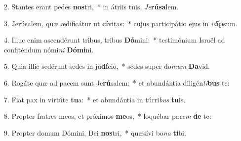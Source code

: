 2. Stantes erant pedes \textbf{nos}tri,~*  in átriis tuis, \textit{Je}\textbf{rú}\textbf{sa}lem.\

3. Jerúsalem, quæ ædificátur ut \textbf{cí}vitas:~*  cujus participátio ejus in \textit{id}\textbf{íp}sum.\

4. Illuc enim ascendérunt tribus, tribus \textbf{Dó}mini:~*  testimónium Israël ad confiténdum nómi\textit{ni} \textbf{Dó}\textbf{mi}ni.\

5. Quia illic sedérunt sedes in ju\textbf{dí}cio,~*  sedes super do\textit{mum} \textbf{Da}vid.\

6. Rogáte quæ ad pacem sunt Je\textbf{rú}salem:~*  et abundántia diligén\textit{ti}\textbf{bus} te:\

7. Fiat pax in virtúte \textbf{tu}a:~*  et abundántia in túrri\textit{bus} \textbf{tu}is.\

8. Propter fratres meos, et próximos \textbf{me}os,~*  loquébar pa\textit{cem} \textbf{de} te:\

9. Propter domum Dómini, Dei \textbf{nos}tri,~*  quæsívi bo\textit{na} \textbf{ti}bi.\

